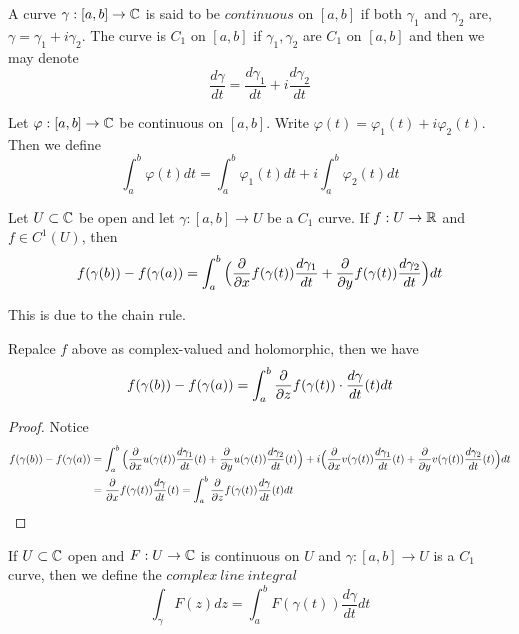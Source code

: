 \begin{definition}
    A curve $\gamma:[a,b]\to \mathbb{C}$ is said to be $continuous$ on $[a,b]$ if both $\gamma_1$ and $\gamma_2$ are, $\gamma = \gamma_1 + i\gamma_2$. The curve is $C_1$ on $[a,b]$ if $\gamma_1,\gamma_2$ are $C_1$ on $[a,b]$ and then we may denote
    \[\dfrac{d\gamma}{dt} = \dfrac{d\gamma_1}{dt} + i\dfrac{d\gamma_2}{dt}\]
\end{definition}

\begin{definition}
    Let $\varphi:[a,b] \to \mathbb{C}$ be continuous on $[a,b]$. Write $\varphi(t) = \varphi_1(t) + i\varphi_2(t)$. Then we define
    \[\int_a^b \varphi(t) dt = \int_a^b \varphi_1(t)dt + i\int_a^b \varphi_2(t) dt\]
\end{definition}

\begin{proposition}
    Let $U\subset \mathbb{C}$ be open and let $\gamma:[a,b]\to U$ be a $C_1$ curve. If $f:U\to\mathbb{R}$ and $f\in C^1(U)$, then
    \[f(\gamma(b))-f(\gamma(a)) = \int_a^b\Big(\dfrac{\partial}{\partial x} f(\gamma(t))\dfrac{d\gamma_1}{dt}+\dfrac{\partial}{\partial y} f(\gamma(t))\dfrac{d\gamma_2}{dt}\Big)dt\]
\end{proposition}
This is due to the chain rule.

\begin{proposition}
    Repalce $f$ above as complex-valued and holomorphic, then we have
    \[f(\gamma(b))-f(\gamma(a)) = \int_a^b \dfrac{\partial}{\partial z} f(\gamma(t))\cdot \dfrac{d\gamma}{dt}(t)dt\]
\end{proposition}
\begin{proof}\par
    Notice
    \[
    \begin{aligned}
    f(\gamma(b)) - f(\gamma(a))
    &= \int_a^b \Big(\dfrac{\partial}{\partial x} u(\gamma(t))\dfrac{d\gamma_1}{dt}(t)+ \dfrac{\partial}{\partial y} u(\gamma(t))\dfrac{d\gamma_2}{dt}(t)\Big) +i \Big(\dfrac{\partial}{\partial x} v(\gamma(t))\dfrac{d\gamma_1}{dt}(t)+ \dfrac{\partial}{\partial y} v(\gamma(t))\dfrac{d\gamma_2}{dt}(t)\Big) dt \\ &= \dfrac{\partial}{\partial x} f(\gamma(t))\dfrac{d\gamma}{dt}(t) = \int_a^b\dfrac{\partial}{\partial z} f(\gamma(t)) \dfrac{d\gamma}{dt}(t) dt
    \end{aligned}
    \]
\end{proof}

\begin{definition}
    If $U\subset \mathbb{C}$ open and $F:U\to\mathbb{C}$ is continuous on $U$ and $\gamma:[a,b]\to U$ is a $C_1$ curve, then we define the $complex\ line\ integral$
    \[\int_{\gamma} F(z)dz = \int_a^b F(\gamma(t))\dfrac{d\gamma}{dt}dt\]
\end{definition}

